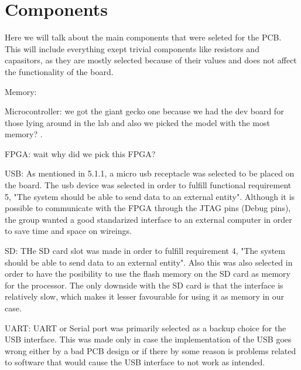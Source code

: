 \section {Components}

Here we will talk about the main components that were seleted for the PCB.
This will include everything exept trivial components like resistors and capasitors, as they are mostly selected because of their values and does not affect the functionality of the board.

Memory: 

Microcontroller: we got the giant gecko one because we had the dev board for those lying around in the lab and also we picked the model with the most memory? .

FPGA: wait why did we pick this FPGA? 

USB: As mentioned in 5.1.1, a micro usb receptacle was selected to be placed on the board. The usb device was selected in order
to fulfill functional requirement 5, "The system should be able to send data to an
external entity". Although it is possible to communicate with the FPGA through the JTAG pins (Debug pins),
the group wanted a good standarized interface to an external computer in order to save time and space on wireings.

SD: THe SD card slot was made in order to fulfill requirement 4, "The system should be able to send data to an
external entity". Also this was also selected in order to have the posibility to use the flash memory on the SD card as memory for the processor. 
The only downside with the SD card is that the interface is relatively slow, which makes it lesser favourable for using it as memory in our case.


UART: UART or Serial port was primarily selected as a backup choice for the USB interface. This was made only in case the implementation
of the USB goes wrong either by a bad PCB design or if there by some reason is problems related to software that would cause the USB interface to not work as intended.

